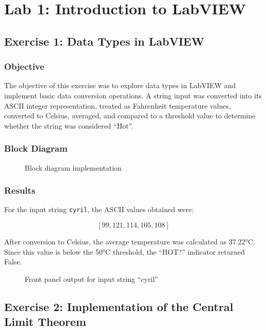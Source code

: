 \documentclass[../../main.tex]{subfiles}
\begin{document}
\chapter{Lab 1: Introduction to LabVIEW}
\label{sec:lab1}

\section{Exercise 1: Data Types in LabVIEW}

\subsection{Objective}
The objective of this exercise was to explore data types in LabVIEW and implement basic data conversion operations. A string input was converted into its ASCII integer representation, treated as Fahrenheit temperature values, converted to Celsius, averaged, and compared to a threshold value to determine whether the string was considered ``Hot''.

\subsection{Block Diagram}
\begin{figure}[H]
    \centering
    \caption{Block diagram implementation}
    \label{fig:placeholder}
\end{figure}

\subsection{Results}

For the input string \texttt{cyril}, the ASCII values obtained were:

\[
[99, 121, 114, 105, 108]
\]

After conversion to Celsius, the average temperature was calculated as 37.22°C. Since this value is below the 50°C threshold, the ``HOT?'' indicator returned False.

\begin{figure}[htbp]
    \centering
    \caption{Front panel output for input string ``cyril''}
\end{figure}


\newpage
\section{Exercise 2: Implementation of the Central Limit Theorem}
\end{document}

